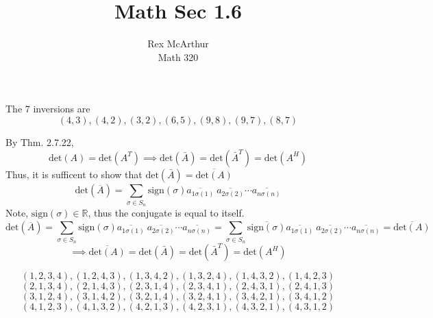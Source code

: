\documentclass[letterpaper,12pt]{article}
\title{Math Sec 1.6}
\author{Rex McArthur\\Math 320}
\theoremstyle{definition}
\begin{document}
\maketitle

The 7 inversions are
\[ (4,3), (4,2),(3,2),(6,5),(9,8),(9,7),(8,7)\]

By Thm. 2.7.22, 
\[ \text{det} (A) = \text{det} (A^T) \implies \text{det}(\bar A) = \text{det} (\bar A^T) = \text{det} (A^H)\]
Thus, it is sufficent to show that $\text{det} (\bar A) = \overline{\text{det} (A)}$
\[\text{det}(\overline{A}) = \sum^{}_{\sigma \in S_n} \text{sign} (\sigma) \overline{a_{1 \sigma(1)}}~\overline{a_{2 \sigma(2)}}\cdots\overline{a_{n \sigma(n)}}\]
Note, $\text{sign} (\sigma) \in \mathbb{R}$, thus the conjugate is equal to itself.
\[\text{det}(\overline{A}) = \sum^{}_{\sigma \in S_n} \text{sign} (\sigma) \overline{a_{1 \sigma(1)}}~\overline{a_{2 \sigma(2)}}\cdots\overline{a_{n \sigma(n)}} =
\sum^{}_{\sigma \in S_n} \overline{\text{sign} (\sigma) }\overline{a_{1 \sigma(1)}}~\overline{a_{2 \sigma(2)}}\cdots\overline{a_{n \sigma(n)}} = \overline{\text{det}(A)}\]
\[\implies\overline{\text{det}(A)}= \text{det}(\bar A) = \text{det} (\bar A^T) = \text{det} (A^H)\]

\[ (1,2,3,4),(1,2,4,3),(1,3,4,2),(1,3,2,4),(1,4,3,2),(1,4,2,3)\]
\[ (2,1,3,4),(2,1,4,3),(2,3,1,4),(2,3,4,1),(2,4,3,1),(2,4,1,3)\]
\[ (3,1,2,4),(3,1,4,2),(3,2,1,4),(3,2,4,1),(3,4,2,1),(3,4,1,2)\]
\[ (4,1,2,3),(4,1,3,2),(4,2,1,3),(4,2,3,1),(4,3,2,1),(4,3,1,2)\]
\end{document}
